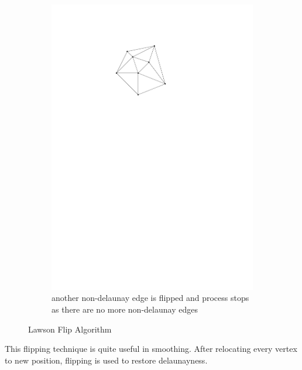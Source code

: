 \begin{figure}[h]
    \begin{subfigure}[t]{0.5\textwidth}
        \centering
        \includegraphics{images/law_flip_c.pdf}
        \caption{another non-delaunay edge is flipped and process stops as there are no more non-delaunay edges}   
    \end{subfigure} 
    \caption{Lawson Flip Algorithm}
    \label{fig:law_flip}
\end{figure}

This flipping technique is quite useful in smoothing. After relocating every vertex to new position, flipping is used to restore delaunayness.

